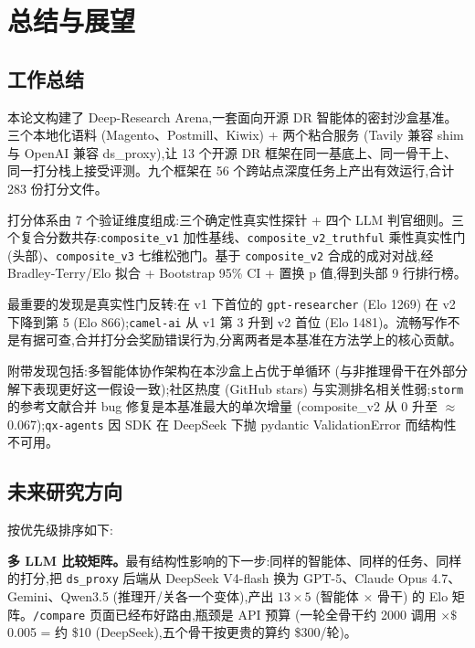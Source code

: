 \documentclass[UTF8,a4paper,12pt,oneside]{ctexart}
\begin{document}
\section{总结与展望}

\subsection{工作总结}

本论文构建了 Deep-Research Arena,一套面向开源 DR 智能体的密封沙盒基准。三个本地化语料 (Magento、Postmill、Kiwix) + 两个粘合服务 (Tavily 兼容 shim 与 OpenAI 兼容 ds\_proxy),让 13 个开源 DR 框架在同一基底上、同一骨干上、同一打分栈上接受评测。九个框架在 56 个跨站点深度任务上产出有效运行,合计 283 份打分文件。

打分体系由 7 个验证维度组成:三个确定性真实性探针 + 四个 LLM 判官细则。三个复合分数共存:\texttt{composite\_v1} 加性基线、\texttt{composite\_v2\_truthful} 乘性真实性门 (头部)、\texttt{composite\_v3} 七维松弛门。基于 \texttt{composite\_v2} 合成的成对对战,经 Bradley-Terry/Elo 拟合 + Bootstrap 95\% CI + 置换 p 值,得到头部 9 行排行榜。

最重要的发现是真实性门反转:在 v1 下首位的 \texttt{gpt-researcher} (Elo 1269) 在 v2 下降到第 5 (Elo 866);\texttt{camel-ai} 从 v1 第 3 升到 v2 首位 (Elo 1481)。流畅写作不是有据可查,合并打分会奖励错误行为,分离两者是本基准在方法学上的核心贡献。

附带发现包括:多智能体协作架构在本沙盒上占优于单循环 (与非推理骨干在外部分解下表现更好这一假设一致);社区热度 (GitHub stars) 与实测排名相关性弱;\texttt{storm} 的参考文献合并 bug 修复是本基准最大的单次增量 (composite\_v2 从 0 升至 \(\approx\) 0.067);\texttt{qx-agents} 因 SDK 在 DeepSeek 下抛 pydantic ValidationError 而结构性不可用。

\subsection{未来研究方向}

按优先级排序如下:

\textbf{多 LLM 比较矩阵。}最有结构性影响的下一步:同样的智能体、同样的任务、同样的打分,把 \texttt{ds\_proxy} 后端从 DeepSeek V4-flash 换为 GPT-5、Claude Opus 4.7、Gemini、Qwen3.5 (推理开/关各一个变体),产出 \(13 \times 5\) (智能体 \(\times\) 骨干) 的 Elo 矩阵。\texttt{/compare} 页面已经布好路由,瓶颈是 API 预算 (一轮全骨干约 2000 调用 \(\times \$\)0.005 = 约 \$10 (DeepSeek),五个骨干按更贵的算约 \$300/轮)。
\end{document}
